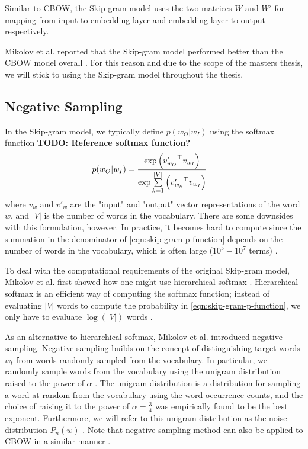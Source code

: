 Similar to CBOW, the Skip-gram model uses the two matrices $W$ and $W'$ for mapping from input to embedding layer and embedding layer to output respectively.

Mikolov et al. reported that the Skip-gram model performed better than the CBOW model overall \cite{mikolov2013a}. For this reason and due to the scope of the masters thesis, we will stick to using the Skip-gram model throughout the thesis.

\subsection{Negative Sampling}
In the Skip-gram model, we typically define $p(w_O | w_I)$ using the softmax function \cite{mikolov2013b} \textbf{TODO: Reference softmax function?}
\begin{align}
    p(w_O | w_I)
    &= \frac{\exp{ \left( {v'_{w_O}}^\top v_{w_I} \right) }} {\exp{ \sum\limits_{k=1}^{|V|} \left( {v'_{w_k}}^\top v_{w_I} \right) }}
    \label{eqn:skip-gram-p-function}
\end{align}
where $v_w$ and $v'_w$ are the "input" and "output" vector representations of the word $w$, and $|V|$ is the number of words in the vocabulary. There are some downsides with this formulation, however. In practice, it becomes hard to compute since the summation in the denominator of \cref{eqn:skip-gram-p-function} depends on the number of words in the vocabulary, which is often large ($10^5 - 10^7$ terms) \cite{mikolov2013b}.

To deal with the computational requirements of the original Skip-gram model, Mikolov et al. first showed how one might use hierarchical softmax \cite{mikolov2013b}. Hierarchical softmax is an efficient way of computing the softmax function; instead of evaluating $|V|$ words to compute the probability in \cref{eqn:skip-gram-p-function}, we only have to evaluate $\log \left( |V| \right)$ words \cite{mikolov2013b}.

As an alternative to hierarchical softmax, Mikolov et al. introduced negative sampling. Negative sampling builds on the concept of distinguishing target words $w_t$ from words randomly sampled from the vocabulary. In particular, we randomly sample words from the vocabulary using the unigram distribution raised to the power of $\alpha$ \cite{mikolov2013b}. The unigram distribution is a distribution for sampling a word at random from the vocabulary using the word occurrence counts, and the choice of raising it to the power of $\alpha = \frac{3}{4}$ was empirically found to be the best exponent. Furthermore, we will refer to this unigram distribution as the noise distribution $P_n(w)$ \cite{mikolov2013b}. Note that negative sampling method can also be applied to CBOW in a similar manner \cite{mikolov2013b}.

